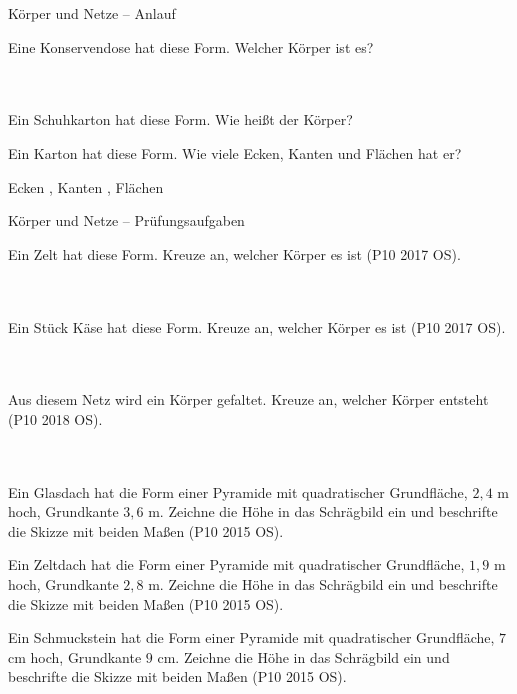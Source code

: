 \setcounter{aufgabe}{8}

\begin{aufgabe}{Körper und Netze – Anlauf}
\begin{teile}
\teil Eine Konservendose hat diese Form. Welcher Körper ist es? \\  \\  \\ 

\teil Ein Schuhkarton hat diese Form. Wie heißt der Körper?

\leerfeld
\teil Ein Karton hat diese Form. Wie viele Ecken, Kanten und Flächen hat er?

Ecken \leerfeld , Kanten \leerfeld , Flächen \leerfeld
\end{teile}
\end{aufgabe}

\begin{aufgabe}{Körper und Netze – Prüfungsaufgaben}
\begin{teile}
\teil Ein Zelt hat diese Form. Kreuze an, welcher Körper es ist \hfill (P10 2017 OS). \\  \\  \\ 

\teil Ein Stück Käse hat diese Form. Kreuze an, welcher Körper es ist \hfill (P10 2017 OS). \\  \\  \\ 

\teil Aus diesem Netz wird ein Körper gefaltet. Kreuze an, welcher Körper entsteht \hfill (P10 2018 OS). \\  \\  \\ 

\teil Ein Glasdach hat die Form einer Pyramide mit quadratischer Grundfläche, $2{,}4$ m hoch, Grundkante $3{,}6$ m. Zeichne die Höhe in das Schrägbild ein und beschrifte die Skizze mit beiden Maßen \hfill (P10 2015 OS).

\teil Ein Zeltdach hat die Form einer Pyramide mit quadratischer Grundfläche, $1{,}9$ m hoch, Grundkante $2{,}8$ m. Zeichne die Höhe in das Schrägbild ein und beschrifte die Skizze mit beiden Maßen \hfill (P10 2015 OS).

\teil Ein Schmuckstein hat die Form einer Pyramide mit quadratischer Grundfläche, $7$ cm hoch, Grundkante $9$ cm. Zeichne die Höhe in das Schrägbild ein und beschrifte die Skizze mit beiden Maßen \hfill (P10 2015 OS).

\end{teile}
\end{aufgabe}

